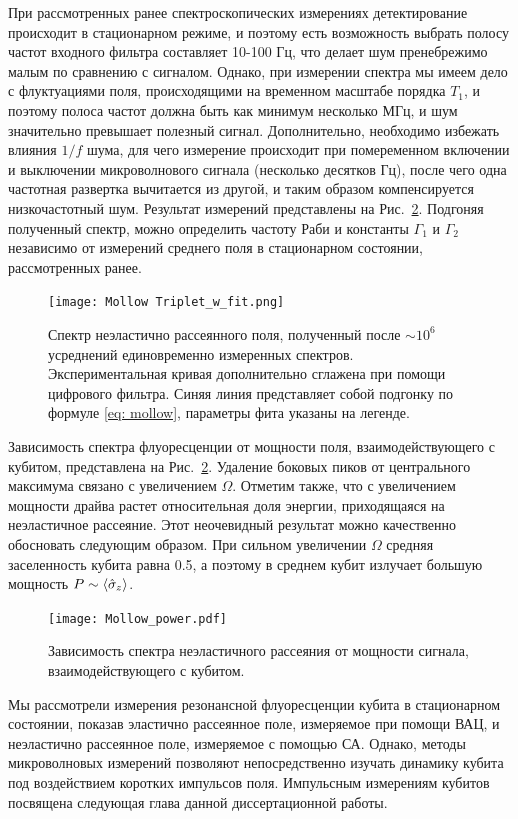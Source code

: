 При рассмотренных ранее спектроскопических измерениях детектирование происходит в стационарном режиме, и поэтому есть возможность выбрать полосу частот входного фильтра составляет 10-100 Гц, что делает шум пренебрежимо малым по сравнению с сигналом. Однако, при измерении спектра мы имеем дело с флуктуациями поля, происходящими на временном масштабе порядка $T_1$, и поэтому полоса частот должна быть как минимум несколько МГц, и шум значительно превышает полезный сигнал. Дополнительно, необходимо избежать влияния $1/f$ шума, для чего измерение происходит при помеременном включении и выключении микроволнового сигнала (несколько десятков Гц), после чего одна частотная развертка вычитается из другой, и таким образом компенсируется низкочастотный шум. Результат измерений представлены на Рис.~\ref{fig: Mollow_w_fit}. Подгоняя полученный спектр, можно определить частоту Раби и константы $\Gamma_1$ и $\Gamma_2$ независимо от измерений среднего поля в стационарном состоянии, рассмотренных ранее. 
\begin{figure}
	\centering
	\texttt{[image: Mollow Triplet\_w\_fit.png]}
	\caption[Спектр неэластично рассеянного поля на кубите.]{Спектр неэластично рассеянного поля, полученный после $\sim 10^6$ усреднений единовременно измеренных спектров. Экспериментальная кривая дополнительно сглажена при помощи цифрового фильтра. Синяя линия представляет собой подгонку по формуле \eqref{eq: mollow}, параметры фита указаны на легенде.}
	\label{fig: Mollow_w_fit}
\end{figure}

Зависимость спектра флуоресценции от мощности поля, взаимодействующего с кубитом, представлена на Рис.~\ref{fig: Mollow_w_fit}. Удаление боковых пиков от центрального максимума связано с увеличением $\Omega$. Отметим также, что с увеличением мощности драйва растет относительная доля энергии, приходящаяся на неэластичное рассеяние. Этот неочевидный результат можно качественно обосновать следующим образом. При сильном увеличении $\Omega$ средняя заселенность кубита равна 0.5, а поэтому в среднем кубит излучает большую мощность $P \sim \braket{\hat{\sigma}_z}$.

\begin{figure}
	\centering
	\texttt{[image: Mollow\_power.pdf]}
	\caption[Зависимость триплета Моллоу от мощности драйва.]{Зависимость спектра неэластичного рассеяния от мощности сигнала, взаимодействующего с кубитом. }
	\label{fig: Mollow_w_fit}
\end{figure} 
Мы рассмотрели измерения резонансной флуоресценции кубита в стационарном состоянии, показав эластично рассеянное поле, измеряемое при помощи ВАЦ, и неэластично рассеянное поле, измеряемое с помощью СА. Однако, методы микроволновых измерений позволяют непосредственно изучать динамику кубита под воздействием коротких импульсов поля. Импульсным измерениям кубитов посвящена следующая глава данной диссертационной работы. 
